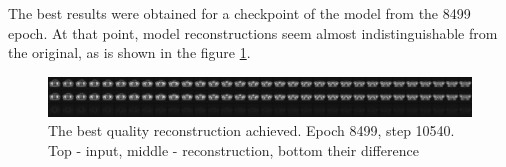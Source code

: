 The best results were obtained for a checkpoint of the model from the 8499 epoch. At that point, model reconstructions seem almost indistinguishable from the original, as is shown in the figure \ref{fig:german_vqvae_best}.

\begin{figure}[H]
    \centering
    \includegraphics[width=\linewidth]{detailed_engineering/German VQVAE/charts/best_german_vqvae.png}
    \caption{The best quality reconstruction achieved. Epoch 8499, step 10540. Top - input, middle - reconstruction, bottom their difference}
    \label{fig:german_vqvae_best}
\end{figure}

